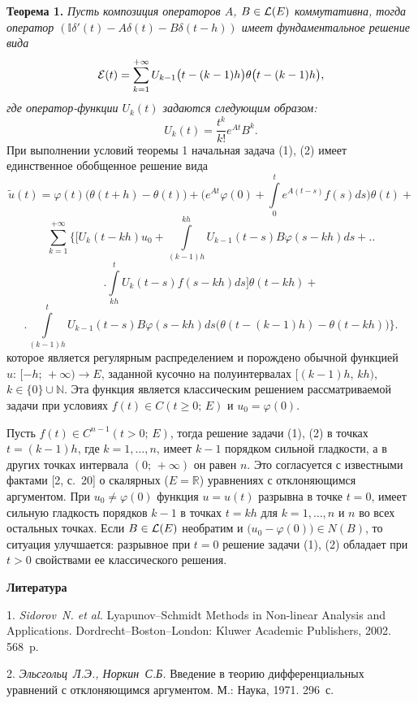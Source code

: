 \textbf{Теорема 1.} {\it Пусть композиция операторов $A$, $B\in{\cal L}(E)$ коммутативна, тогда оператор $\left({\mathbb I}\delta'(t)-A\delta(t)-B\delta(t-h)\right)$ имеет фундаментальное решение вида
$$
{\cal E}(t)=\sum\limits_{k=1}^{+\infty}U_{k-1}\bigl(t-(k-1)h\bigr)\theta\bigl(t-(k-1)h\bigr),
$$
где оператор-функции $U_{k}(t)$ задаются следующим образом:
$$
U_{k}(t)=\frac{t^{k}}{k!}e^{At}B^{k}.
$$}
При выполнении условий теоремы 1 начальная задача (1), (2) имеет единственное обобщенное решение вида
$$
\tilde{u}(t)=\varphi(t)\bigl(\theta(t+h)-\theta(t)\bigr)+\bigl(e^{At}\varphi(0)+\int\limits_{0}^{t}e^{A(t-s)}f(s)ds\bigr)\theta(t)+
$$
$$
\sum\limits_{k=1}^{+\infty}\biggl\lbrace\biggl[ U_{k}(t-kh)u_{0}+\int\limits_{(k-1)h}^{kh}U_{k-1}(t-s)B\varphi(s-kh)ds+\biggr.\biggr.
$$
$$
\biggl.\int\limits_{kh}^{t}U_{k}(t-s)f(s-kh)ds\biggr]\theta(t-kh)+
$$
$$
\biggl.\int\limits_{(k-1)h}^{t}U_{k-1}(t-s)B\varphi(s-kh)ds\bigl(\theta(t-(k-1)h)-\theta(t-kh)\bigr)\biggr\rbrace.
$$
которое является регулярным распределением и порождено обычной функцией $u:\,[-h;\,+\infty)\to E$, заданной кусочно на полуинтервалах $[(k-1)h,\,kh)$, $k\in\lbrace0\rbrace\cup{\mathbb N}$. Эта функция является классическим решением рассматриваемой задачи при условиях $f(t)\in C(t\geq0;\,E)$ и $u_{0}=\varphi(0)$.

Пусть $f(t)\in C^{n-1}(t>0;\,E)$, тогда решение задачи (1), (2) в точках $t=(k-1)h$, где $k=1,\ldots,n$, имеет $k-1$ порядком сильной гладкости, а в других точках интервала $(0;\,+\infty)$ он равен $n$. Это согласуется с известными фактами  [2, с.~20] о скалярных ($E={\mathbb R}$) уравнениях с отклоняющимся аргументом. При $u_{0}\neq\varphi(0)$ функция $u=u(t)$ разрывна в точке $t=0$, имеет сильную гладкость порядков $k-1$ в точках $t=kh$ для $k=1,\ldots,n$ и $n$ во всех остальных точках. Если $B\in{\cal L}(E)$ необратим и $\bigl(u_{0}-\varphi(0)\bigr)\in N(B)$, то ситуация улучшается: разрывное при $t=0$ решение задачи (1), (2) обладает при $t>0$  свойствами ее классического решения.

\smallskip \centerline{\bf Литература}\nopagebreak

1. {\it Sidorov~N. et al.} Lyapunov--Schmidt Methods in Non-linear Analysis and Applications. Dordrecht--Boston--London: Kluwer Academic Publishers, 2002. 568~p.

2. {\it Эльсгольц~Л.Э., Норкин~С.Б.} Введение в теорию дифференциальных уравнений с отклоняющимся аргументом. М.: Наука, 1971. 296~с.

